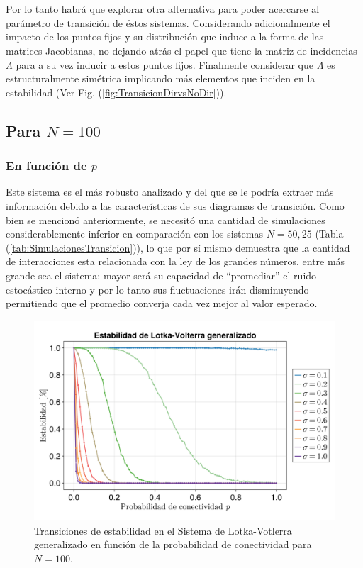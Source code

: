 \\
\\
Por lo tanto habrá que explorar otra alternativa para poder acercarse al parámetro de transición de éstos sistemas. Considerando adicionalmente el impacto de los puntos fijos y su distribución que induce a la forma de las matrices Jacobianas, no dejando atrás el papel que tiene la matriz de incidencias $\Lambda$ para a su vez inducir a estos puntos fijos. Finalmente considerar que $\Lambda$ es estructuralmente simétrica implicando más elementos que inciden en la estabilidad (Ver Fig. (\ref{fig:TransicionDirvsNoDir})).

\subsection{Para $N=100$}

\subsubsection*{En función de $p$}

Este sistema es el más robusto analizado y del que se le podría extraer más información debido a las características de sus diagramas de transición. Como bien se mencionó anteriormente, se necesitó una cantidad de simulaciones considerablemente inferior en comparación con los sistemas $N=50,25$ (Tabla (\ref{tab:SimulacionesTransicion})), lo que por sí mismo demuestra que la cantidad de interacciones esta relacionada con la ley de los grandes números, entre más grande sea el sistema: mayor será su capacidad de ``promediar'' el ruido estocástico interno y por lo tanto sus fluctuaciones irán disminuyendo permitiendo que el promedio converja cada vez mejor al valor esperado.
\begin{figure}[h!]
	\centering
	\includegraphics[scale=0.2]{../Imagenes/EstabilidadLKpLin.png}
	\caption{Transiciones de estabilidad en el Sistema de Lotka-Votlerra generalizado en función de la probabilidad de conectividad para $N=100$.}
	\label{fig:EstabilidadLKpLin}
\end{figure}

